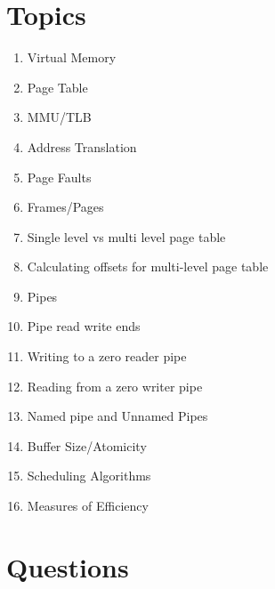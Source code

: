 \section{Topics}

\begin{enumerate}
  \item Virtual Memory
  \item Page Table
  \item MMU/TLB
  \item Address Translation
  \item Page Faults
  \item Frames/Pages
  \item Single level vs multi level page table
  \item Calculating offsets for multi-level page table
  \item Pipes
  \item Pipe read write ends
  \item Writing to a zero reader pipe
  \item Reading from a zero writer pipe
  \item Named pipe and Unnamed Pipes
  \item Buffer Size/Atomicity
  \item Scheduling Algorithms
  \item Measures of Efficiency
\end{enumerate}

\section{Questions}

